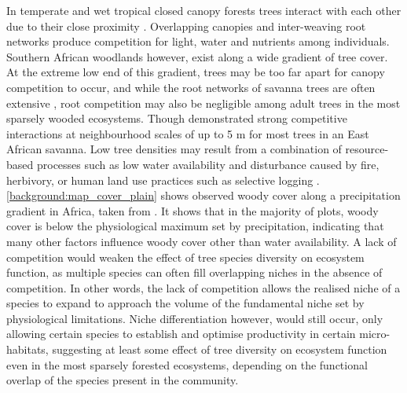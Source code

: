 \begin{refsection}
In temperate and wet tropical closed canopy forests trees interact with each other due to their close proximity \citep{Coomes2007a, Purves2007}. Overlapping canopies and inter-weaving root networks produce competition for light, water and nutrients among individuals. Southern African woodlands however, exist along a wide gradient of tree cover. At the extreme low end of this gradient, trees may be too far apart for canopy competition to occur, and while the root networks of savanna trees are often extensive \citep{Belsky1994}, root competition may also be negligible among adult trees in the most sparsely wooded ecosystems. Though \citet{Dohn2017} demonstrated strong competitive interactions at neighbourhood scales of up to 5 m for most trees in an East African savanna. Low tree densities may result from a combination of resource-based processes such as low water availability and disturbance caused by fire, herbivory, or human land use practices such as selective logging \citep{Ryan2016}. \autoref{background:map_cover_plain} shows observed woody cover along a precipitation gradient in Africa, taken from \citet{Sankaran2005}. It shows that in the majority of plots, woody cover is below the physiological maximum set by precipitation, indicating that many other factors influence woody cover other than water availability. A lack of competition would weaken the effect of tree species diversity on ecosystem function, as multiple species can often fill overlapping niches in the absence of competition. In other words, the lack of competition allows the realised niche of a species to expand to approach the volume of the fundamental niche set by physiological limitations. Niche differentiation however, would still occur, only allowing certain species to establish and optimise productivity in certain micro-habitats, suggesting at least some effect of tree diversity on ecosystem function even in the most sparsely forested ecosystems, depending on the functional overlap of the species present in the community.


\end{refsection}
